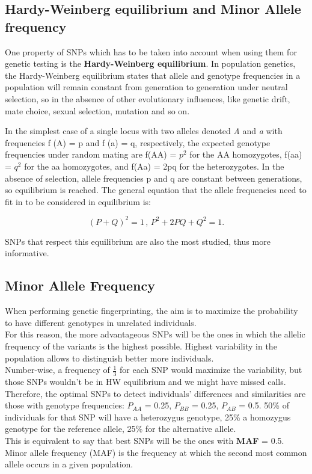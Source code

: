\subsection{Hardy-Weinberg equilibrium and Minor Allele frequency}

One property of SNPs which has to be taken into account when using them for genetic testing is the \textbf{Hardy-Weinberg equilibrium}.
In population genetics, the Hardy-Weinberg equilibrium states that allele and genotype frequencies in a population will remain constant from generation to generation under neutral selection, so in the absence of other evolutionary influences, like genetic drift, mate choice, sexual selection, mutation and so on.

In the simplest case of a single locus with two alleles denoted \emph{A} and \emph{a} with frequencies f (A) = p and f (a) = q, respectively, the expected genotype frequencies under random mating are f(AA) = $p^{2}$ for the AA homozygotes, f(aa) = $q^{2}$ for the aa homozygotes, and f(Aa) = 2pq for the heterozygotes. In the absence of selection, allele frequencies p and q are constant between generations, so equilibrium is reached. The general equation that the allele frequencies need to fit in to be considered in equilibrium is:

\begin{equation}
( P + Q )^2 = 1 \, , \, P^2 + 2PQ + Q^2 = 1 .
\end{equation}

SNPs that respect this equilibrium are also the most studied, thus more informative.

\subsection{Minor Allele Frequency}
When performing genetic fingerprinting, the aim is to maximize the probability to have different genotypes in unrelated individuals. \\
For this reason, the more advantageous SNPs will be the ones in which the allelic frequency of the variants is the highest possible. Highest variability in the population allows to distinguish better more individuals.
\\
Number-wise, a frequency of $\frac{1}{3}$ for each SNP would maximize the variability, but those SNPs wouldn't be in HW equilibrium and we might have missed calls. \\
Therefore, the optimal SNPs to detect individuals’ differences and similarities are those with genotype frequencies: $P_{AA}$ = 0.25, $P_{BB}$ = 0.25, $P_{AB}$ = 0.5. 50\% of individuals for that SNP will have a heterozygus genotype, 25\% a homozygus genotype for the reference allele, 25\% for the alternative allele.
\\
This is equivalent to say that best SNPs will be the ones with \textbf{MAF} = 0.5. Minor allele frequency (MAF) is the frequency at which the second most common allele occurs in a given population.

